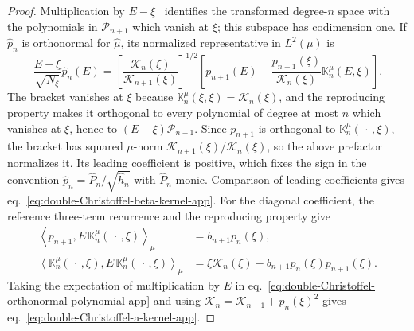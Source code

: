 \documentclass[a4paper,11pt]{article}
\theoremstyle{definition}
\theoremstyle{remark}
\newcommand{\cP}{\mathcal P}
\begin{document}
\begin{proof}
Multiplication by $E-\xi$~\cite{KautskyGolub1983} identifies the transformed degree-$n$ space
with the polynomials in $\cP_{n+1}$ which vanish at $\xi$; this subspace
has codimension one.  If $\widehat p_n$ is orthonormal for $\widehat\mu$, its
normalized representative in $L^2(\mu)$ is
\begin{equation}
   \frac{E-\xi}{\sqrt{N_\xi}}\widehat p_n(E)
   =\left[
      \frac{\mathcal K_n(\xi)}{\mathcal K_{n+1}(\xi)}
   \right]^{1/2}
   \left[
      p_{n+1}(E)
      -\frac{p_{n+1}(\xi)}{\mathcal K_n(\xi)}
       \mathbb K_n^\mu(E,\xi)
   \right].
   \label{eq:double-Christoffel-orthonormal-polynomial-app}
\end{equation}
The bracket vanishes at $\xi$ because $\mathbb K_n^\mu(\xi,\xi)=\mathcal K_n(\xi)$, and the reproducing property makes it orthogonal to every polynomial of degree at most $n$ which vanishes at $\xi$, hence to $(E-\xi)\cP_{n-1}$. Since $p_{n+1}$ is orthogonal to $\mathbb K_n^\mu(\,\cdot\,,\xi)$, the bracket has squared $\mu$-norm $\mathcal K_{n+1}(\xi)/\mathcal K_n(\xi)$, so the above prefactor normalizes it. Its leading coefficient is positive, which fixes the sign in the convention $\widehat p_n=\widehat P_n/\sqrt{\widehat h_n}$ with $\widehat P_n$ monic. Comparison of leading coefficients gives
eq.~\eqref{eq:double-Christoffel-beta-kernel-app}.  For the diagonal
coefficient, the reference three-term recurrence and the reproducing
property give
\begin{equation}
\begin{aligned}
   \left\langle p_{n+1},E \,\mathbb K_n^\mu(\,\cdot\,,\xi)\right\rangle_\mu
   &=b_{n+1}p_n(\xi),\\
   \left\langle \mathbb K_n^\mu(\,\cdot\,,\xi),
      E \,\mathbb K_n^\mu(\,\cdot\,,\xi)\right\rangle_\mu
   &=\xi\mathcal K_n(\xi)
     -b_{n+1}p_n(\xi)p_{n+1}(\xi).
\end{aligned}
   \label{eq:one-root-kernel-E-elements-app}
\end{equation}
Taking the expectation of multiplication by $E$ in
eq.~\eqref{eq:double-Christoffel-orthonormal-polynomial-app} and using
$\mathcal K_n=\mathcal K_{n-1}+p_n(\xi)^2$ gives
eq.~\eqref{eq:double-Christoffel-a-kernel-app}.
\end{proof}
\end{document}
